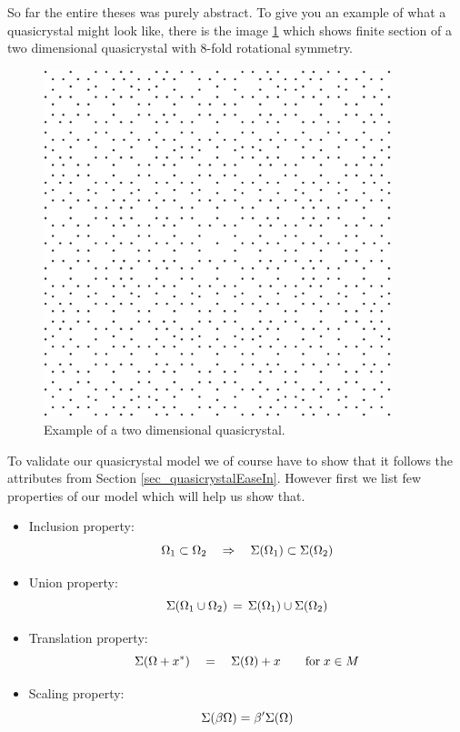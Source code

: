 \documentclass[text.tex]{subfiles}
\begin{document}
So far the entire theses was purely abstract. To give you an example of what a quasicrystal might look like, there is the image \ref{fig_quasicrystalFirstExample} which shows finite section of a two dimensional quasicrystal with $8$-fold rotational symmetry.

\begin{figure}[h]
\centering
\includegraphics[width=0.9\textwidth]{img/firstExample}
\caption{Example of a two dimensional quasicrystal.}
\label{fig_quasicrystalFirstExample}
\end{figure}

To validate our quasicrystal model we of course have to show that it follows the attributes from Section \ref{sec_quasicrystalEaseIn}. However first we list few properties of our model which will help us show that. 

\begin{itemize}
\item Inclusion property: $$\Omega_1\subset\Omega_2 \quad\Rightarrow\quad \Sigma(\Omega_1)\subset\Sigma(\Omega_2)$$
\item Union property: $$\Sigma(\Omega_1\cup\Omega_2) \,=\, \Sigma(\Omega_1)\cup\Sigma(\Omega_2)$$
\item Translation property: $$\Sigma(\Omega+x^\ast) \quad=\quad \Sigma(\Omega)+x\qquad \text{for}\; x\in M$$
\item Scaling property: $$\Sigma(\beta\Omega) = \beta'\Sigma(\Omega)$$
\end{itemize}
\end{document}
